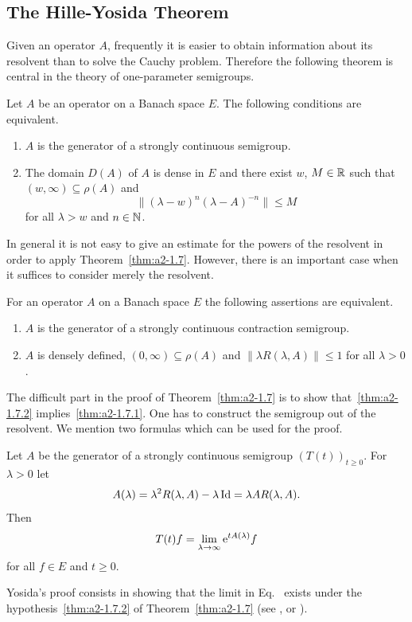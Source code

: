 \subsection{The Hille-Yosida Theorem} \label{subsec:a2-1.se3}%
Given an operator $A$, frequently it is easier to obtain information about its resolvent than to solve the Cauchy problem.
Therefore the following theorem is central in the theory of one-parameter semigroups.
\begin{theorem}\label{thm:a2-1.7}
Let $A$ be an operator on a Banach space $E$.
The following conditions are equivalent.
\begin{enumerate}[\upshape (a)]
\item \label{thm:a2-1.7.1}
$A$ is the generator of a strongly continuous semigroup.
\item \label{thm:a2-1.7.2}
The domain  $D(A)$ of\/ $A$ is dense in $E$ and there exist $w$, $M \in \mathbb{R}$ such that $(w,\infty) \subseteq \rho(A)$ and
\[
    \| {(\lambda - w)^{n}} (\lambda-A)^{-n}\| \leq M 
\]
for all $\lambda > w$ and $n \in \mathbb{N}$.
\end{enumerate}
\end{theorem}
In general it is not easy to give an estimate for the powers of the resolvent in order to apply Theorem~\ref{thm:a2-1.7}. 
However, there is an important case when it suffices to consider merely the resolvent.
\begin{corollary}\label{cor:a2-1.8}
For an operator $A$ on a Banach space $E$ the following assertions are equivalent.
\begin{enumerate}[\upshape (a)]
\item \label{cor:a2-1.8.1}
$A$ is the generator of a strongly continuous contraction semigroup.
\item \label{cor:a2-1.8.2}
$A$ is densely defined, $(0,\infty) \subseteq \rho(A)$ and $\|\lambda R(\lambda,A)\| \leq 1$ for all $\lambda > 0$.
\end{enumerate}
\end{corollary}
The difficult part in the proof of Theorem~\ref{thm:a2-1.7}   is to show that~\ref{thm:a2-1.7.2}   implies~\ref{thm:a2-1.7.1}. 
One has to construct the semigroup out of the resolvent.
We mention two formulas which can be used for the proof.
\begin{proposition}\label{prop:a2-1.9}
Let $A$ be the generator of a strongly continuous semigroup
$(T(t))_{t \geq 0}$.
For $\lambda > 0$ let 
\[
A(\lambda) = \lambda^{2} R(\lambda,A)-\lambda \operatorname{Id}  =\lambda A R(\lambda,A).
\]
Then
\begin{equation}\label{eq:a2-1.2}
    T(t)f = \lim_{\lambda \to \infty} \mathrm{e}^{tA(\lambda)}f
\end{equation}
for all $f \in E$ and $t \geq 0$.
\end{proposition}
Yosida's proof consists in showing that the limit in Eq.~ exists under the hypothesis~\ref{thm:a2-1.7.2} of Theorem~\ref{thm:a2-1.7}  
(see \textcite{davies:1980}, \textcite{goldstein:1985a} or \textcite{pazy:1983}).

